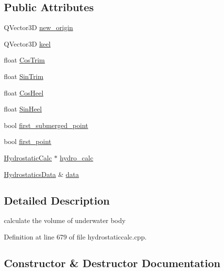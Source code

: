 \subsection*{Public Attributes}
\begin{DoxyCompactItemize}
\item 
Q\+Vector3D \hyperlink{structVolumeCalc_aed779c2eace630d0d41239df4d371407}{new\+\_\+origin}
\item 
Q\+Vector3D \hyperlink{structVolumeCalc_a07e433d13508d3342e7f6a50604c40d3}{keel}
\item 
float \hyperlink{structVolumeCalc_a6de823cbd9bb3aaedcb398a43b3187a5}{Cos\+Trim}
\item 
float \hyperlink{structVolumeCalc_a36511f2f033b5488a4f677586f3e8f97}{Sin\+Trim}
\item 
float \hyperlink{structVolumeCalc_a5f92422c5175c94b265581fd19f1da24}{Cos\+Heel}
\item 
float \hyperlink{structVolumeCalc_ac1612ccb79673d6800b89a1acf46a028}{Sin\+Heel}
\item 
bool \hyperlink{structVolumeCalc_a3bc27914e09f86d93cb28daad90dddc1}{first\+\_\+submerged\+\_\+point}
\item 
bool \hyperlink{structVolumeCalc_ab639da79639aeb33b3aaeb429283f8ca}{first\+\_\+point}
\item 
\hyperlink{classShipCAD_1_1HydrostaticCalc}{Hydrostatic\+Calc} $\ast$ \hyperlink{structVolumeCalc_a5b3b6d4983faa3c309ddc85981945993}{hydro\+\_\+calc}
\item 
\hyperlink{structShipCAD_1_1HydrostaticsData}{Hydrostatics\+Data} \& \hyperlink{structVolumeCalc_acb7ab639ec6e5c77daf116c6eb58693a}{data}
\end{DoxyCompactItemize}


\subsection{Detailed Description}
calculate the volume of underwater body 

Definition at line 679 of file hydrostaticcalc.\+cpp.



\subsection{Constructor \& Destructor Documentation}
